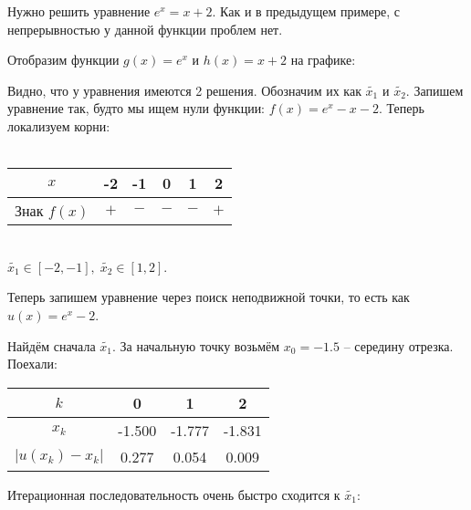 \documentclass[../main.tex]{subfile}
\begin{document}
\begin{example}
	Нужно решить уравнение \(e^x=x+2.\) Как и в предыдущем примере, с
	непрерывностью у данной функции проблем нет.
	\newpage

	Отобразим функции $g(x)=e^x$ и $h(x)=x+2$ на графике:

	{\makeatletter
	\let\par\@@par
	\par{}
	\everypar{}
	\begin{wrapfigure}{l}{0.45\textwidth}
		
	\end{wrapfigure}

	Видно, что у уравнения имеются 2 решения. Обозначим их как
	$\widetilde{x_1}$ и $\widetilde{x_2}$. Запишем уравнение так, будто мы
	ищем нули функции: $f(x) = e^x-x-2$. Теперь локализуем корни:\\\\
	\begin{tabular}{ *{6}{|c}| }
		\hline
		$x$		& -2	& -1	& 0	& 1	& 2 \\
		\hline
		Знак $f(x)$ 	& $+$	& $-$	& $-$	& $-$ 	& $+$\\
		\hline
	\end{tabular}
	\\

	$\widetilde{x_1}\in[-2,-1],\;\widetilde{x_2}\in[1,2]$.

	Теперь запишем уравнение через поиск неподвижной точки, то есть как
	$u(x)=e^x-2$.
	\par}


	Найдём сначала $\widetilde{x_1}$. За начальную точку возьмём $x_0=-1.5$ --
	середину отрезка. Поехали:
	\newline

	\begin{tabular}{*{4}{|c}|}
		\hline
		$k$		& 0	& 1	& 2	\\
		\hline
		$x_k$		&-1.500	&-1.777	&-1.831	\\
		\hline
		$|u(x_k)-x_k|$	& 0.277	& 0.054	& 0.009	\\
		\hline
	\end{tabular}
	\newline

	Итерационная последовательность очень быстро сходится к
	$\widetilde{x_1}$:
	\newline

	

	\newpage


\end{example}
\end{document}
